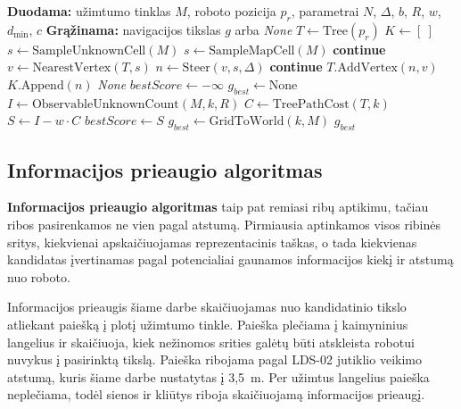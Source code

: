 \documentclass[]{VUMIFTemplateClass}
\begin{document}
\begin{algorithm}[H]
\caption{RRT}
\begin{algorithmic}[1]
\STATE \textbf{Duodama:} užimtumo tinklas $M$, roboto pozicija $p_r$, parametrai $N$, $\Delta$, $b$, $R$, $w$, $d_{\min}$, $c$
\STATE \textbf{Grąžinama:} navigacijos tikslas $g$ arba \textit{None}
\STATE $T \leftarrow \mathrm{Tree}(p_r)$
\STATE $K \leftarrow [\ ]$
    \STATE $s \leftarrow \mathrm{SampleUnknownCell}(M)$
  \ELSE
    \STATE $s \leftarrow \mathrm{SampleMapCell}(M)$
  \ENDIF
    \STATE \textbf{continue}
  \ENDIF
  \STATE $v \leftarrow \mathrm{NearestVertex}(T,s)$
  \STATE $n \leftarrow \mathrm{Steer}(v,s,\Delta)$
    \STATE \textbf{continue}
  \ENDIF
  \STATE $T.\mathrm{AddVertex}(n,v)$
    \STATE $K.\mathrm{Append}(n)$
  \ENDIF
\ENDFOR
{}
  \RETURN \textit{None}
\ENDIF
\STATE $bestScore \leftarrow -\infty$
\STATE $g_{best} \leftarrow \mathrm{None}$
  \STATE $I \leftarrow \mathrm{ObservableUnknownCount}(M,k,R)$
  \STATE $C \leftarrow \mathrm{TreePathCost}(T,k)$
  \STATE $S \leftarrow I - w \cdot C$
    \STATE $bestScore \leftarrow S$
    \STATE $g_{best} \leftarrow \mathrm{GridToWorld}(k,M)$
  \ENDIF
\ENDFOR
\RETURN $g_{best}$
\end{algorithmic}
\end{algorithm}

\subsection{Informacijos prieaugio algoritmas}

\textbf{Informacijos prieaugio algoritmas} taip pat remiasi ribų aptikimu, tačiau ribos pasirenkamos ne vien pagal atstumą. Pirmiausia aptinkamos visos ribinės sritys,
kiekvienai apskaičiuojamas reprezentacinis taškas, o tada kiekvienas kandidatas įvertinamas pagal potencialiai gaunamos informacijos kiekį ir atstumą nuo
roboto.

Informacijos prieaugis šiame darbe skaičiuojamas nuo kandidatinio tikslo atliekant paiešką į plotį užimtumo tinkle. Paieška plečiama į kaimyninius langelius
ir skaičiuoja, kiek nežinomos srities galėtų būti atskleista robotui nuvykus į pasirinktą tikslą. Paieška ribojama pagal LDS-02 jutiklio veikimo
atstumą, kuris šiame darbe nustatytas į 3,5~m. Per užimtus langelius paieška neplečiama, todėl sienos ir kliūtys riboja skaičiuojamą informacijos prieaugį.
\end{document}
